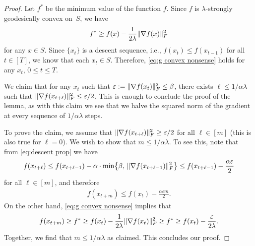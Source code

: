 \documentclass[aos]{imsart}
\theoremstyle{definition}
\numberwithin{equation}{section}
\DeclarePairedDelimiter{\norm}{\lVert}{\rVert}
\newcommand{\R}{{\mathbb{R}}}
\newcommand{\eps}{\varepsilon}
\begin{document}
\begin{proof}
	Let $f^*$ be the minimum value of the function $f$.
  Since $f$ is $\lambda$-strongly geodesically convex on~$S$, we have
  \begin{align}\label{eq:g convex nonsense}
    f^* \geq f(x) - \frac{1}{2\lambda} \norm{\nabla f(x)}_F^2
  \end{align}
	for any $x \in S$.
  Since $\{x_t\}$ is a descent sequence, i.e., $f(x_t) \leq f(x_{t-1})$ for all $t\in[T]$, we know that each $x_t \in S$.
  Therefore, \cref{eq:g convex nonsense} holds for any $x_t$, $0 \leq t \leq T$.

  We claim that for any $x_t$ such that $\eps := \norm{\nabla f(x_t)}_F^2 \leq \beta$, there exists $\ell \leq 1/\alpha \lambda$ such that $\norm{\nabla f(x_{t + \ell})}_F^2 \leq \eps/2$. This is enough to conclude the proof of the lemma, as with this claim we see that we halve the squared norm of the gradient at every sequence of $1/\alpha \lambda$ steps.

	To prove the claim, we assume that $\norm{\nabla f(x_{t+\ell})}_F^2 \geq \eps/2$ for all $\ell\in[m]$ (this is also true for $\ell=0$).
  We wish to show that $m \leq 1/\alpha\lambda$.
  To see this, note that from \cref{eq:descent prop} we have
  \begin{align*}
    f(x_{t+\ell})
  \leq f(x_{t+\ell-1}) - \alpha \cdot \min \bigl\{\beta, \, \norm{\nabla f(x_{t+\ell-1})}^2_F \bigr\}
  \leq f(x_{t+\ell-1}) - \frac{\alpha\eps}2
  \end{align*}
  for all $\ell\in[m]$, and therefore
  \begin{align*}
    f(x_{t+m}) \leq f(x_t) - \frac{\alpha\eps m}2.
  \end{align*}
  On the other hand, \cref{eq:g convex nonsense} implies that
  \begin{align*}
    f(x_{t+m})
  \geq f^* \geq f(x_t) - \frac{1}{2\lambda} \norm{\nabla f(x_t)}_F^2
  \geq f^* \geq f(x_t) - \frac{\eps}{2\lambda}.
  \end{align*}
  Together, we find that $m \leq 1/\alpha\lambda$ as claimed.
  This concludes our proof.
\end{proof}
\end{document}
